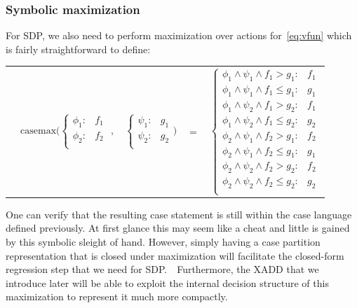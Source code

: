 \documentclass[twoside,11pt]{article}
\newcommand{\casemax}{\mathrm{casemax}}
\begin{document}
\subsubsection*{Symbolic maximization}
For SDP, we also need to perform maximization over actions for~\eqref{eq:vfun} which is fairly straightforward
to define:

{%
\begin{center}
\begin{tabular}{r c c c l}
&
\hspace{-9mm} $\casemax \Bigg(
  \begin{cases}
    \phi_1: & f_1 \\ 
    \phi_2: & f_2 \\ 
  \end{cases}$
$,$
&
\hspace{-4mm}
  $\begin{cases}
    \psi_1: & g_1 \\ 
    \psi_2: & g_2 \\ 
  \end{cases} \Bigg)$
&
\hspace{-4mm} 
$ = $
&
\hspace{-4mm}
  $\begin{cases}
  \phi_1 \wedge \psi_1 \wedge f_1 > g_1    : & f_1 \\ 
  \phi_1 \wedge \psi_1 \wedge f_1 \leq g_1 : & g_1 \\ 
  \phi_1 \wedge \psi_2 \wedge f_1 > g_2    : & f_1 \\ 
  \phi_1 \wedge \psi_2 \wedge f_1 \leq g_2 : & g_2 \\ 
  \phi_2 \wedge \psi_1 \wedge f_2 > g_1    : & f_2 \\ 
  \phi_2 \wedge \psi_1 \wedge f_2 \leq g_1 : & g_1 \\ 
  \phi_2 \wedge \psi_2 \wedge f_2 > g_2    : & f_2 \\ 
  \phi_2 \wedge \psi_2 \wedge f_2 \leq g_2 : & g_2 \\ 
  \end{cases}$\label{symbolicMax}
\end{tabular}
\end{center}
}
One can verify that the resulting case statement is still
within the case language defined previously.  At first
glance this may seem like a cheat and little is gained
by this symbolic sleight of hand.  However, simply
having a case partition representation that is closed under 
maximization will facilitate the closed-form regression 
step that we need for SDP.\ \  Furthermore, the 
XADD that we introduce later will be able to exploit the 
internal decision structure of this
maximization to represent it much more compactly.
\end{document}
